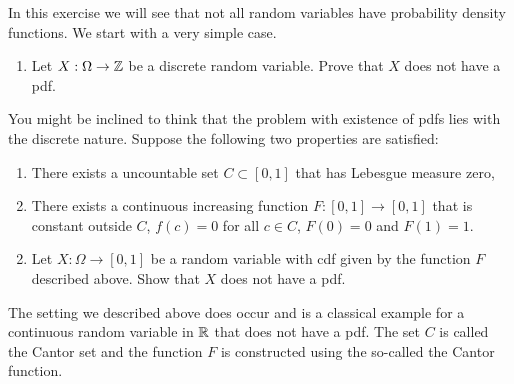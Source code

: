 \begin{problem}\label{prb:no_pdf}
In this exercise we will see that not all random variables have probability density functions. We start with a very simple case.
\begin{enumerate}[label=(\alph*)]
\item Let $X : \Omega \to \mathbb Z$ be a discrete random variable. Prove that $X$ does not have a pdf.
\end{enumerate}

You might be inclined to think that the problem with existence of pdfs lies with the discrete nature. Suppose the following two properties are satisfied:
\begin{enumerate}
\item There exists a uncountable set $C \subset [0,1]$ that has Lebesgue measure zero,
\item There exists a continuous increasing function $F: [0,1] \to [0,1]$ that is constant outside $C$, $f(c) = 0$ for all $c \in C$, $F(0) = 0$ and $F(1) = 1$.
\end{enumerate}

\begin{enumerate}[label=(\alph*)]
\setcounter{enumi}{1}
\item Let $X : \Omega \to [0,1]$ be a random variable with cdf given by the function $F$ described above. Show that $X$ does not have a pdf.
\end{enumerate}

The setting we described above does occur and is a classical example for a continuous random variable in $\mathbb R$ that does not have a pdf. The set $C$ is called the Cantor set and the function $F$ is constructed using the so-called the Cantor function. 

\end{problem}

